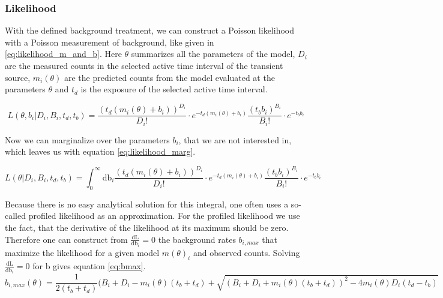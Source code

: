 \documentclass[twocolumn]{aa}
\begin{document}

\subsubsection*{Likelihood}

With the defined background treatment, we can construct a Poisson likelihood with a Poisson measurement of background, like given in \ref{eq:likelihood_m_and_b}. Here $\theta$ summarizes all the parameters of the model, $D_{i}$ are the measured counts in the selected active time interval of the transient source, $m_{i}(\theta)$ are the predicted counts from the model evaluated at the parameters $\theta$ and $t_{d}$ is the exposure of the selected active time interval.

\begin{equation}
	L(\theta, b_{i}|D_{i}, B_{i},t_{d},t_{b}) = \frac{(t_{d}(m_{i}(\theta)+ b_{i}))^{D_{i}}}{D_{i}!}\cdot e^{-t_{d}(m_{i}(\theta)+b_{i})} \frac{(t_{b} b_{i})^{B_{i}}}{B_{i}!}\cdot e^{-t_{b} b_{i}}
  \label{eq:likelihood_m_and_b}
\end{equation}

Now we can marginalize over the parameters $b_{i}$, that we are not interested in, which leaves us with equation \ref{eq:likelihood_marg}.

\begin{equation}
	L(\theta|D_{i}, B_{i},t_{d},t_{b}) = \int_{0}^{\infty}\textrm{db}_{i}\frac{(t_{d}(m_{i}(\theta)+ b_{i}))^{D_{i}}}{D_{i}!}\cdot e^{-t_{d}(m_{i}(\theta)+b_{i})} \frac{(t_{b} b_{i})^{B_{i}}}{B_{i}!}\cdot e^{-t_{b}b_{i}}
  \label{eq:likelihood_marg}
\end{equation}

Because there is no easy analytical solution for this integral, one often uses a so-called profiled likelihood as an approximation. For the profiled likelihood we use the fact, that the derivative of the likelihood at its maximum should be zero. Therefore one can construct from $\frac{\textrm{dL}}{\textrm{db}_i}=0$ the background rates $b_{i, max}$ that maximize the likelihood for a given model $m(\theta)_{i}$ and observed counts. Solving $\frac{\textrm{dL}}{\textrm{db}_i}=0$ for b gives equation \ref{eq:bmax}.
\begin{equation}
	b_{i,max}(\theta)=\frac{1}{2(t_{b}+t_{d})}(B_{i}+D_{i}-m_{i}(\theta)(t_{b}+t_{d})+\sqrt{(B_{i}+D_{i}+m_{i}(\theta)(t_{b}+t_{d}))^{2}-4m_{i}(\theta)D_{i}(t_{d}-t_{b})}
  \label{eq:bmax}
\end{equation}
\end{document}
